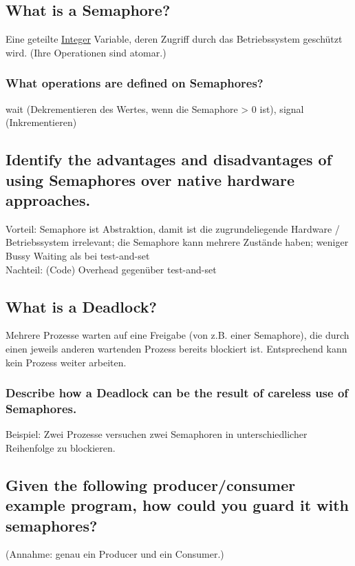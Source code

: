 \subsection{What is a Semaphore?}
Eine geteilte \underline{Integer} Variable, deren Zugriff durch das Betriebssystem geschützt wird.
(Ihre Operationen sind atomar.)

\subsubsection{What operations are defined on Semaphores?}
wait (Dekrementieren des Wertes, wenn die Semaphore > 0 ist), signal (Inkrementieren)

\subsection{Identify the advantages and disadvantages of using Semaphores over native hardware approaches.}
Vorteil: Semaphore ist Abstraktion, damit ist die zugrundeliegende Hardware / Betriebssystem irrelevant; die Semaphore kann mehrere Zustände haben; weniger Bussy Waiting als bei test-and-set\\
Nachteil: (Code) Overhead gegenüber test-and-set

\subsection{What is a Deadlock?}
Mehrere Prozesse warten auf eine Freigabe (von z.B. einer Semaphore), die durch einen jeweils anderen wartenden Prozess bereits blockiert ist.
Entsprechend kann kein Prozess weiter arbeiten. 

\subsubsection{Describe how a Deadlock can be the result of careless use of Semaphores.}
Beispiel: Zwei Prozesse versuchen zwei Semaphoren in unterschiedlicher Reihenfolge zu blockieren.

\subsection{Given the following producer/consumer example program, how could you guard it with semaphores?}
(Annahme: genau ein Producer und ein Consumer.)


